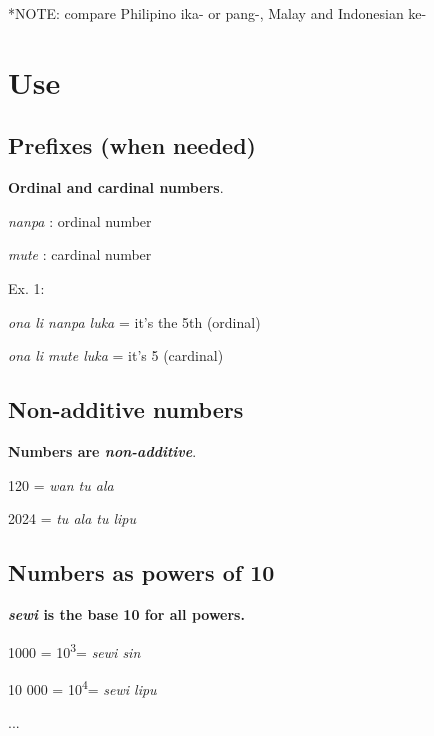 \documentclass{article}
\begin{document}
\vspace{5pt}	

	*NOTE: compare Philipino ika- or pang-, Malay and Indonesian ke-

\newpage



\section{Use}
	
\subsection{Prefixes (when needed)}

    \textbf{Ordinal and cardinal numbers}.
	
	\textit{nanpa} {}:  ordinal number
	
	\textit{mute} {}: cardinal number
	
	\vspace{5 pt}
	
	Ex. 1:
	
	\textit{ona li nanpa luka} = it's the 5th (ordinal)
	
	\textit{ona li mute luka} = it's 5 (cardinal) 
	
	
\subsection{Non-additive numbers}
	
	\textbf{Numbers are \emph{non-additive}}.
	
	\vspace{5 pt}
	
	120 = \emph{wan tu ala}
	
	2024 = \emph{tu ala tu lipu}
	
\subsection{Numbers as powers of 10}
    
   \textbf{ \textit{sewi} is the base 10 for all powers.}
    
    \vspace{5 pt}
	
	1000 = 10\textsuperscript{3}= \emph{sewi sin}
	
	10 000 = 10\textsuperscript{4}= \emph{sewi lipu}
	
	...
	
\end{document}
